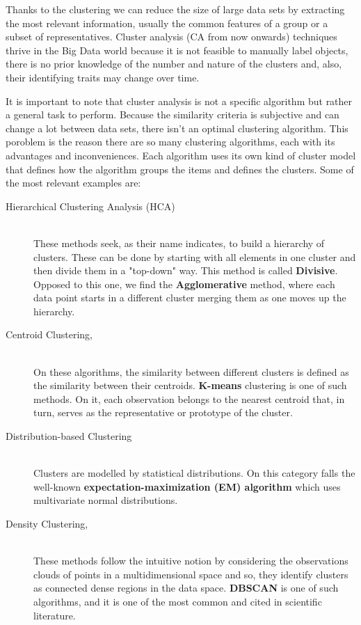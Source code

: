 Thanks to the clustering we can reduce the size of large data sets by extracting the most relevant information, usually the common features of a group or a subset of representatives. Cluster analysis (CA from now onwards) techniques thrive in the Big Data world because it is not feasible to manually label objects, there is no prior knowledge of the number and nature of the clusters and, also, their identifying traits may change over time. 

It is important to note that cluster analysis is not a specific algorithm but rather a general task to perform. Because the similarity criteria is subjective and can change a lot between data sets, there isn't an optimal clustering algorithm. This poroblem is the reason there are so many clustering algorithms, each with its advantages and inconveniences. Each algorithm uses its own kind of cluster model that defines how the algorithm groups the items and defines the clusters. Some of the most relevant examples are:
\label{subsec:algorithm_kinds}
\begin{description}
\item [Hierarchical Clustering Analysis (HCA)] \hfill \\ 
These methods seek, as their name indicates, to build a hierarchy of clusters. These can be done by starting with all elements in one cluster and then divide them in a "top-down" way. This method is called \textbf{Divisive}. Opposed to this one, we find the \textbf{Agglomerative} method, where each data point starts in a different cluster merging them as one moves up the hierarchy.
\item [Centroid Clustering,] \hfill \\ 
On these algorithms, the similarity between different clusters is defined as the similarity between their centroids. \textbf{K-means} clustering is one of such methods. On it, each observation belongs to the nearest centroid that, in turn, serves as the representative or prototype of the cluster.
\item [Distribution-based Clustering] \hfill \\ 
Clusters are modelled by statistical distributions. On this category falls the well-known \textbf{expectation-maximization (EM) algorithm} which uses multivariate normal distributions.
\item [Density Clustering,] \hfill \\ 
These methods follow the intuitive notion by considering the observations clouds of points in a multidimensional space and so, they identify clusters as connected dense regions in the data space. \textbf{DBSCAN} is one of such algorithms, and it is one of the most common and cited in scientific literature. 
\end{description}


